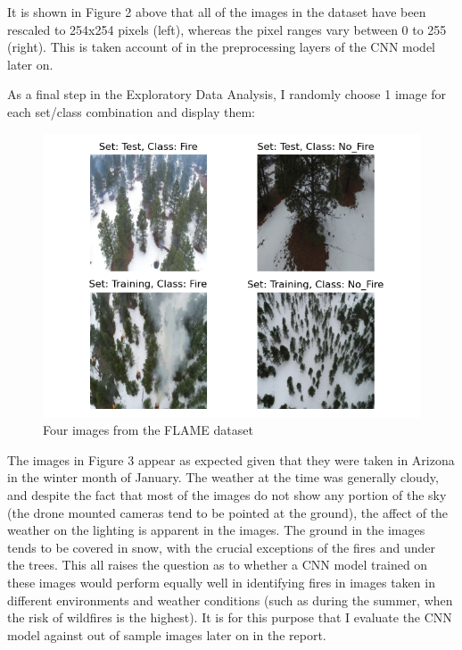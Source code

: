 \documentclass[a4paper,11pt]{article} %
\begin{document}
It is shown in Figure 2 above that all of the images in the dataset have been rescaled to 254x254 pixels (left), whereas the pixel
ranges vary between 0 to 255 (right). This is taken account of in the preprocessing layers of the CNN model later on.

\medskip

As a final step in the Exploratory Data Analysis, I randomly choose 1 image for each set\//class combination
and display them:

\begin{figure}[h]
    \centering
    \includegraphics{../figures/example_images.png}
    \caption{Four images from the FLAME dataset}
\end{figure}

The images in Figure 3 appear as expected given that they were taken in Arizona in the winter month of January.
The weather at the time was generally cloudy, and despite the fact that most of the images do not show any portion of
the sky (the drone mounted cameras tend to be pointed at the ground), the affect of the weather on the lighting is apparent
in the images. The ground in the images tends to be covered in snow, with the crucial exceptions of the fires and under the trees.
This all raises the question as to whether a CNN model trained on these images would perform equally well in identifying fires in images
taken in different environments and weather conditions (such as during the summer, when the risk of wildfires is the highest). It is for this
purpose that I evaluate the CNN model against out of sample images later on in the report.
\end{document}
